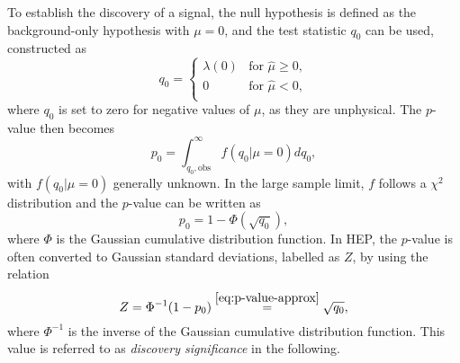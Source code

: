 To establish the discovery of a signal, the null hypothesis is defined as the background-only hypothesis with $\mu = 0$, and the test statistic $q_0$ can be used, constructed as
\begin{equation}
    q_0 =
     \begin{cases}
       \lambda(0) & \text{for } \hat{\mu} \ge 0, \\
       0 & \text{for } \hat{\mu} < 0,  \\
     \end{cases}
     \label{eq:q0}
  \end{equation}
where $q_0$ is set to zero for negative values of $\mu$, as they are unphysical.
The $p$-value then becomes
\begin{equation}
    \label{eq:p-value-discovery}
    p_0 = \int_{q_0, \text{obs}}^{\infty} f \left( q_0 | \mu = 0 \right) dq_0,
\end{equation}
with $f \left( q_0 | \mu = 0 \right)$ generally unknown. In the large sample limit, $f$ follows a $\chi^2$ distribution and the $p$-value can be written as
\begin{equation}
    \label{eq:p-value-approx}
    p_0 = 1 - \Phi( \sqrt{q_0}),
\end{equation}
where $\Phi$ is the Gaussian cumulative distribution function. 
In HEP, the $p$-value is often converted to Gaussian standard deviations, labelled as $Z$, by using the relation
\begin{equation}
    \label{eq:Z0}
    Z = \Phi^{-1} ( 1 - p_0) \overset{\ref{eq:p-value-approx}}{=} \sqrt{q_0},
\end{equation}
where $\Phi^{-1}$ is the inverse of the Gaussian cumulative distribution function. 
This value is referred to as \emph{discovery significance} in the following. 

